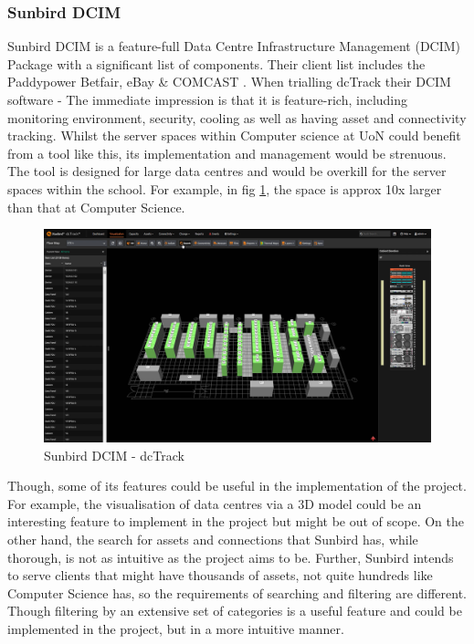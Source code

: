 \documentclass [11pt,a4paper]{article}
\begin{document}
\subsubsection{Sunbird DCIM}
\label{sec:sunbird}
Sunbird DCIM is a feature-full Data Centre Infrastructure Management (DCIM) Package with a significant list of components. Their client list includes the Paddypower Betfair, eBay \& COMCAST \cite{Sunbird-we-know-data-centres}. When trialling dcTrack their DCIM software - The immediate impression is that it is feature-rich, including monitoring environment, security, cooling as well as having asset and connectivity tracking. Whilst the server spaces within Computer science at UoN could benefit from a tool like this, its implementation and management would be strenuous. The tool is designed for large data centres and would be overkill for the server spaces within the school. For example, in fig \ref{fig:sunbird_dcTrack}, the space is approx 10x larger than that at Computer Science. 

\begin{figure}[H]
    \centering
    \includegraphics[width=0.8\linewidth]{images/sunbirddcim.png}
    \caption{Sunbird DCIM - dcTrack}
    \label{fig:sunbird_dcTrack}
\end{figure}

Though, some of its features could be useful in the implementation of the project. For example, the visualisation of data centres via a 3D model could be an interesting feature to implement in the project but might be out of scope. On the other hand, the search for assets and connections that Sunbird has, while thorough, is not as intuitive as the project aims to be. Further, Sunbird intends to serve clients that might have thousands of assets, not quite hundreds like Computer Science has, so the requirements of searching and filtering are different. Though filtering by an extensive set of categories is a useful feature and could be implemented in the project, but in a more intuitive manner.
\end{document}
